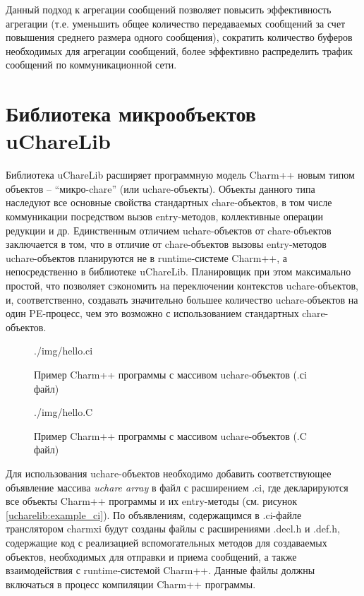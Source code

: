 \documentclass[11pt, oneside, a4paper]{article}
\begin{document}
Данный подход к агрегации сообщений позволяет повысить эффективность агрегации (т.е. уменьшить общее количество передаваемых сообщений за счет повышения среднего
размера одного сообщения), сократить количество буферов необходимых для агрегации сообщений, более эффективно распределить трафик сообщений по коммуникационной 
сети.

\section{Библиотека микрообъектов uChareLib} 

Библиотека uChareLib расширяет программную модель Charm++ новым типом объектов -- ``микро-chare'' (или uchare-объекты). Объекты данного типа 
наследуют все основные свойства стандартных chare-объектов, в том числе коммуникации посредством вызов entry-методов, коллективные операции
редукции и др. Единственным отличием uchare-объектов от chare-объектов заключается в том, что в отличие от chare-объектов вызовы entry-методов 
uchare-объектов планируются не в runtime-системе Charm++, а непосредственно в библиотеке uChareLib. Планировщик при этом максимально простой,
что позволяет сэкономить на переключении контекстов uchare-объектов, и, соответственно, создавать значительно большее количество uchare-объектов 
на один PE-процесс, чем это возможно с использованием стандартных chare-объектов.


\begin{figure}[!t]
\centering

		{./img/hello.ci}
\caption{Пример Charm++ программы с массивом uchare-объектов (.сi файл)}
\label{ucharelib:example_ci}

		{./img/hello.C}
\caption{Пример Charm++ программы с массивом uchare-объектов (.C файл)}
\label{ucharelib:example_C}
\end{figure}

Для использования uchare-объектов необходимо добавить соответствующее объявление массива \textit{uchare array} в файл с расширением .ci, где
декларируются все объекты Charm++ программы и их entry-методы (см. рисунок \ref{ucharelib:example_ci}). По объявлениям, содержащимся в .ci-файле 
транслятором charmxi будут созданы файлы с расширениями .decl.h и .def.h, содержащие код с реализацией вспомогательных методов для создаваемых 
объектов, необходимых для отправки и приема сообщений, а также взаимодействия с runtime-системой Charm++. Данные файлы должны включаться в 
процесс компиляции Charm++ программы.
\end{document}
